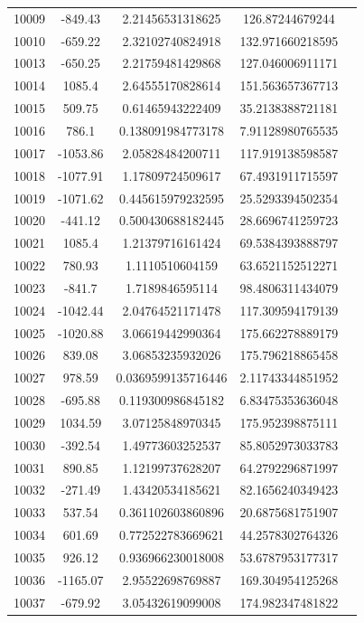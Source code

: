 {\begin{longtable}{ccccc}
10009 & -849.43 & 2.21456531318625 & 126.87244679244 \\
10010 & -659.22 & 2.32102740824918 & 132.971660218595 \\
10013 & -650.25 & 2.21759481429868 & 127.046006911171 \\
10014 & 1085.4 & 2.64555170828614 & 151.563657367713 \\
10015 & 509.75 & 0.61465943222409 & 35.2138388721181 \\
10016 & 786.1 & 0.138091984773178 & 7.91128980765535 \\
10017 & -1053.86 & 2.05828484200711 & 117.919138598587 \\
10018 & -1077.91 & 1.17809724509617 & 67.4931911715597 \\
10019 & -1071.62 & 0.445615979232595 & 25.5293394502354 \\
10020 & -441.12 & 0.500430688182445 & 28.6696741259723 \\
10021 & 1085.4 & 1.21379716161424 & 69.5384393888797 \\
10022 & 780.93 & 1.1110510604159 & 63.6521152512271 \\
10023 & -841.7 & 1.7189846595114 & 98.4806311434079 \\
10024 & -1042.44 & 2.04764521171478 & 117.309594179139 \\
10025 & -1020.88 & 3.06619442990364 & 175.662278889179 \\
10026 & 839.08 & 3.06853235932026 & 175.796218865458 \\
10027 & 978.59 & 0.0369599135716446 & 2.11743344851952 \\
10028 & -695.88 & 0.119300986845182 & 6.83475353636048 \\
10029 & 1034.59 & 3.07125848970345 & 175.952398875111 \\
10030 & -392.54 & 1.49773603252537 & 85.8052973033783 \\
10031 & 890.85 & 1.12199737628207 & 64.2792296871997 \\
10032 & -271.49 & 1.43420534185621 & 82.1656240349423 \\
10033 & 537.54 & 0.361102603860896 & 20.6875681751907 \\
10034 & 601.69 & 0.772522783669621 & 44.2578302764326 \\
10035 & 926.12 & 0.936966230018008 & 53.6787953177317 \\
10036 & -1165.07 & 2.95522698769887 & 169.304954125268 \\
10037 & -679.92 & 3.05432619099008 & 174.982347481822 \\

\end{longtable}}
